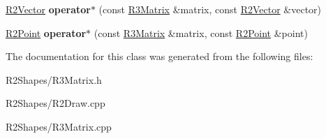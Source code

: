 \begin{DoxyCompactItemize}
\item 
\hyperlink{class_r2_vector}{R2\+Vector} {\bfseries operator$\ast$} (const \hyperlink{class_r3_matrix}{R3\+Matrix} \&matrix, const \hyperlink{class_r2_vector}{R2\+Vector} \&vector)\hypertarget{class_r3_matrix_a1c35b832022d76a7123918c7edbe351a}{}\label{class_r3_matrix_a1c35b832022d76a7123918c7edbe351a}

\item 
\hyperlink{class_r2_point}{R2\+Point} {\bfseries operator$\ast$} (const \hyperlink{class_r3_matrix}{R3\+Matrix} \&matrix, const \hyperlink{class_r2_point}{R2\+Point} \&point)\hypertarget{class_r3_matrix_acabce224f46c36b42787b46a1ccaa098}{}\label{class_r3_matrix_acabce224f46c36b42787b46a1ccaa098}

\end{DoxyCompactItemize}


The documentation for this class was generated from the following files\+:\begin{DoxyCompactItemize}
\item 
R2\+Shapes/R3\+Matrix.\+h\item 
R2\+Shapes/R2\+Draw.\+cpp\item 
R2\+Shapes/R3\+Matrix.\+cpp\end{DoxyCompactItemize}
